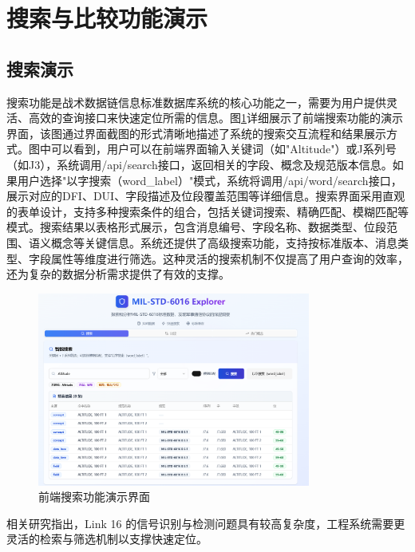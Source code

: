 \bigskip

\section{搜索与比较功能演示}

\subsection{搜索演示}
搜索功能是战术数据链信息标准数据库系统的核心功能之一，需要为用户提供灵活、高效的查询接口来快速定位所需的信息。图\ref{fig:search-demo}详细展示了前端搜索功能的演示界面，该图通过界面截图的形式清晰地描述了系统的搜索交互流程和结果展示方式。图中可以看到，用户可以在前端界面输入关键词（如"Altitude"）或J系列号（如J3），系统调用/api/search接口，返回相关的字段、概念及规范版本信息。如果用户选择"以字搜索（word\_label）"模式，系统将调用/api/word/search接口，展示对应的DFI、DUI、字段描述及位段覆盖范围等详细信息。搜索界面采用直观的表单设计，支持多种搜索条件的组合，包括关键词搜索、精确匹配、模糊匹配等模式。搜索结果以表格形式展示，包含消息编号、字段名称、数据类型、位段范围、语义概念等关键信息。系统还提供了高级搜索功能，支持按标准版本、消息类型、字段属性等维度进行筛选。这种灵活的搜索机制不仅提高了用户查询的效率，还为复杂的数据分析需求提供了有效的支撑。

\begin{figure}[H]
  \centering
  \includegraphics[width=0.8\textwidth]{chapters/fig-0/frontend-search-demo.png}
  \caption{前端搜索功能演示界面}
  \label{fig:search-demo}
\end{figure}

相关研究指出，{Link 16} 的信号识别与检测问题具有较高复杂度，工程系统需要更灵活的检索与筛选机制以支撑快速定位。

